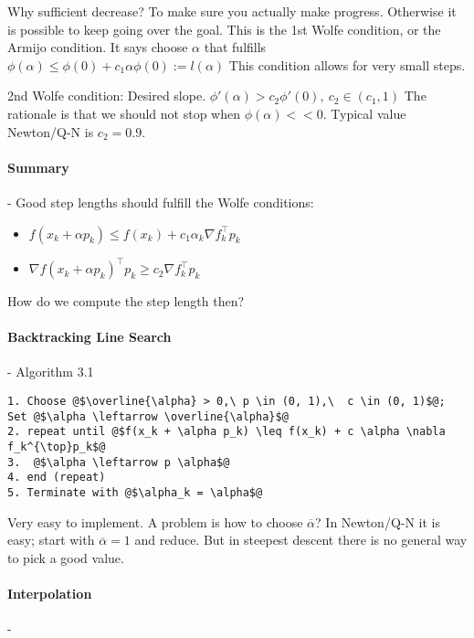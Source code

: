 \documentclass{article}
\begin{document}
\medskip Why sufficient decrease? To make sure you actually make progress. Otherwise it is possible to keep going over the goal. This is the 1st Wolfe condition, or the Armijo condition. It says choose $\alpha$ that fulfills $\phi(\alpha) \leq \phi(0) + c_1 \alpha \phi(0) := l(\alpha)$
This condition allows for very small steps.

\medskip 2nd Wolfe condition: Desired slope. $\phi'(\alpha) > c_2 \phi'(0),\  c_2 \in(c_1, 1)$
The rationale is that we should not stop when $\phi(\alpha) << 0$. Typical value Newton/Q-N is $c_2 = 0.9$.

\paragraph{Summary}- Good step lengths should fulfill the Wolfe conditions:
\begin{itemize}
  \item $f(x_k + \alpha p_k) \leq f(x_k) + c_1\alpha_k \nabla f_k^{\top} p_k$
  \item $\nabla f (x_k + \alpha p_k)^{\top} p_k \geq c_2 \nabla f_k^{\top} p_k$
\end{itemize}

How do we compute the step length then?

\paragraph{Backtracking Line Search}- Algorithm 3.1

\lstset{basicstyle=\ttfamily}
\begin{lstlisting}
1. Choose @$\overline{\alpha} > 0,\ p \in (0, 1),\  c \in (0, 1)$@; Set @$\alpha \leftarrow \overline{\alpha}$@
2. repeat until @$f(x_k + \alpha p_k) \leq f(x_k) + c \alpha \nabla f_k^{\top}p_k$@
3.  @$\alpha \leftarrow p \alpha$@
4. end (repeat)
5. Terminate with @$\alpha_k = \alpha$@ 
\end{lstlisting}

Very easy to implement. A problem is how to choose $\overline{\alpha}$? In Newton/Q-N it is easy; start with $\overline{\alpha} = 1$ and reduce. But in steepest descent
there is no general way to pick a good value.

\paragraph{Interpolation}-
\end{document}
